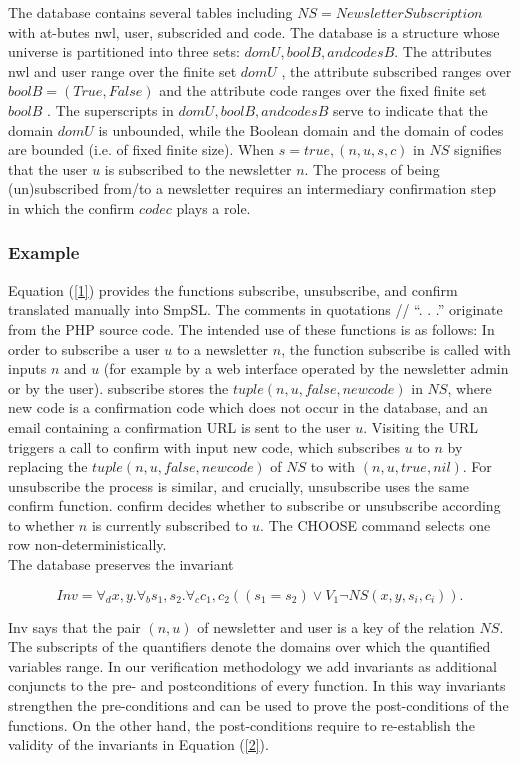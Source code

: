 \documentclass[12pt]{gji}
\begin{document}
The database contains several tables including $NS = NewsletterSubscription$ with at-butes nwl, user, subscrided and code. The database is a structure whose universe is partitioned into three sets: $domU, boolB, and codesB$. The attributes nwl and user range over the finite set $domU$  , the attribute subscribed ranges over $boolB =  (True, False)$ and the attribute code ranges over the fixed finite set $boolB$ . The superscripts in $domU, boolB, and codesB$ serve to indicate that the domain $domU$ is unbounded, while the Boolean domain and the domain of codes are bounded (i.e. of fixed finite size). When $s=true, (n,u,s,c )$ in $NS$ signifies that the user $u$ is subscribed to the newsletter $n$. The process of being (un)subscribed from/to a newsletter requires an intermediary confirmation step in which the confirm $code c$ plays a role. 

\subsubsection{Example}

Equation (\ref{1}) provides the functions subscribe, unsubscribe, and confirm translated manually into SmpSL. The comments in quotations // “. . .” originate from the PHP source code. The intended use of these functions is as follows: In order to subscribe a user $u$ to a newsletter $n$, the function subscribe is called with inputs $n$ and $u$ (for example by a web interface operated by the newsletter admin or by the user). subscribe stores the $tuple(n,u,false,new code)$ in $NS$, where new code is a confirmation code which does not occur in the database, and an email containing a confirmation URL is sent to the user $u$. Visiting the URL triggers a call to confirm with input new code, which subscribes $u$ to $n$ by replacing the $tuple(n,u,false,new code)$ of $NS$ to with $(n,u,true,nil)$. For unsubscribe the process is similar, and crucially, unsubscribe uses the same confirm function. confirm decides whether to subscribe or unsubscribe according to whether $n$ is currently subscribed to $u$. The CHOOSE command selects one row non-deterministically.\\
The database preserves the invariant

\begin{equation}
    Inv = \forall_d x,y.\forall_b s_1,s_2.\forall_c c_1,c_2 ((s_1=s_2 )\vee V_1 \neg NS(x,y,s_i,c_i )).
    \label{1}
\end{equation}

 Inv says that the pair $(n, u)$ of newsletter and user is a key of the relation $NS$. The subscripts of the quantifiers denote the domains over which the quantified variables range. In our verification methodology we add invariants as additional conjuncts to the pre- and postconditions of every function. In this way invariants strengthen the pre-conditions and can be used to prove the post-conditions of the functions. On the other hand, the post-conditions require to re-establish the validity of the invariants in Equation (\ref{2}).
\end{document}
